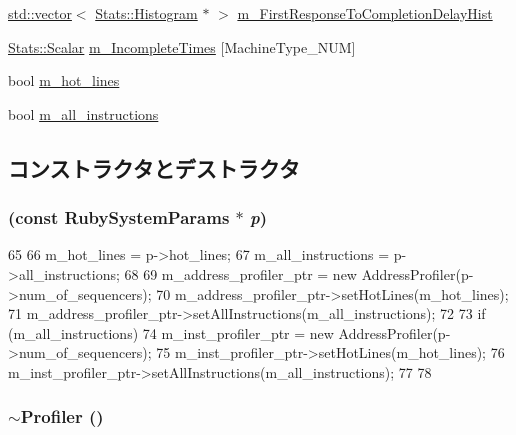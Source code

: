 \begin{DoxyCompactItemize}
\hyperlink{classstd_1_1vector}{std::vector}$<$ \hyperlink{classStats_1_1Histogram}{Stats::Histogram} $\ast$ $>$ \hyperlink{classProfiler_a6236c49462f2162310ca62569ec869ac}{m\_\-FirstResponseToCompletionDelayHist}
\item 
\hyperlink{classStats_1_1Scalar}{Stats::Scalar} \hyperlink{classProfiler_a4646ee2cafcbe46b66af5d8253eac92f}{m\_\-IncompleteTimes} \mbox{[}MachineType\_\-NUM\mbox{]}
\item 
bool \hyperlink{classProfiler_a3b63dfc643f2cf98e6d5deff9fce467e}{m\_\-hot\_\-lines}
\item 
bool \hyperlink{classProfiler_a32e2ae13dc24a9bd92b83fa9e02477ff}{m\_\-all\_\-instructions}
\end{DoxyCompactItemize}


\subsection{コンストラクタとデストラクタ}
\hypertarget{classProfiler_ab2c59c9f25786669282690a23306cd69}{
\subsubsection[{Profiler}]{ (const RubySystemParams $\ast$ {\em p})}}
\label{classProfiler_ab2c59c9f25786669282690a23306cd69}



\begin{DoxyCode}
65 {
66     m_hot_lines = p->hot_lines;
67     m_all_instructions = p->all_instructions;
68 
69     m_address_profiler_ptr = new AddressProfiler(p->num_of_sequencers);
70     m_address_profiler_ptr->setHotLines(m_hot_lines);
71     m_address_profiler_ptr->setAllInstructions(m_all_instructions);
72 
73     if (m_all_instructions) {
74         m_inst_profiler_ptr = new AddressProfiler(p->num_of_sequencers);
75         m_inst_profiler_ptr->setHotLines(m_hot_lines);
76         m_inst_profiler_ptr->setAllInstructions(m_all_instructions);
77     }
78 }
\end{DoxyCode}
\hypertarget{classProfiler_aa0f87e10a29a76f6358f43b09621df51}{
\subsubsection[{$\sim$Profiler}]{\setlength{\rightskip}{0pt plus 5cm}$\sim${\bf Profiler} ()}}
\label{classProfiler_aa0f87e10a29a76f6358f43b09621df51}



